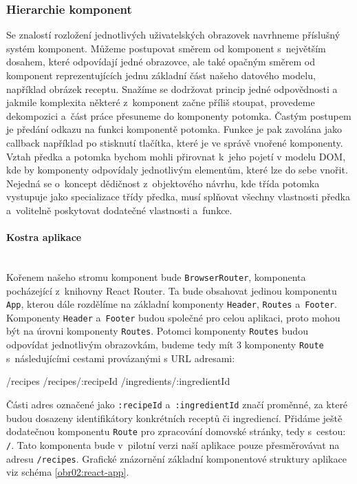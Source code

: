 \subsubsection{Hierarchie komponent}

Se znalostí rozložení jednotlivých uživatelských obrazovek navrhneme příslušný systém komponent. Můžeme postupovat směrem od komponent s~největším dosahem, které odpovídají jedné obrazovce, ale také opačným směrem od komponent reprezentujících jednu základní část našeho datového modelu, například obrázek receptu. Snažíme se dodržovat princip jedné odpovědnosti a jakmile komplexita některé z~komponent začne příliš stoupat, provedeme dekompozici a~část práce přesuneme do komponenty potomka. Častým postupem je předání odkazu na funkci komponentě potomka. Funkce je pak zavolána jako callback například po stisknutí tlačítka, které je ve správě vnořené komponenty. Vztah předka a potomka bychom mohli přirovnat k~jeho pojetí v modelu DOM, kde by komponenty odpovídaly jednotlivým elementům, které lze do sebe vnořit. Nejedná se o~koncept dědičnost z~objektového návrhu, kde třída potomka vystupuje jako specializace třídy předka, musí splňovat všechny vlastnosti předka a~volitelně poskytovat dodatečné vlastnosti a~funkce.

\paragraph{Kostra aplikace}\mbox{}\\

Kořenem našeho stromu komponent bude \texttt{BrowserRouter}, komponenta pocházející z~knihovny React Router. Ta bude obsahovat jedinou komponentu \texttt{App}, kterou dále rozdělíme na základní komponenty \texttt{Header}, \texttt{Routes} a~\texttt{Footer}. Komponenty \texttt{Header} a~\texttt{Footer} budou společné pro celou aplikaci, proto mohou být na úrovni komponenty \texttt{Routes}. Potomci komponenty \texttt{Routes} budou odpovídat jednotlivým obrazovkám, budeme tedy mít $3$ komponenty \texttt{Route} s~následujícími cestami provázanými s URL adresami:

\begin{code}
/recipes
/recipes/:recipeId
/ingredients/:ingredientId
\end{code}

Části adres označené jako \texttt{:recipeId} a~\texttt{:ingredientId} značí proměnné, za které budou dosazeny identifikátory konkrétních receptů či ingrediencí. Přidáme ještě dodatečnou komponentu \texttt{Route} pro zpracování domovské stránky, tedy s~cestou: \texttt{/}. Tato komponenta bude v~pilotní verzi naší aplikace pouze přesměrovávat na adresu \texttt{/recipes}. Grafické znázornění základní komponentové struktury aplikace viz schéma \ref{obr02:react-app}.


